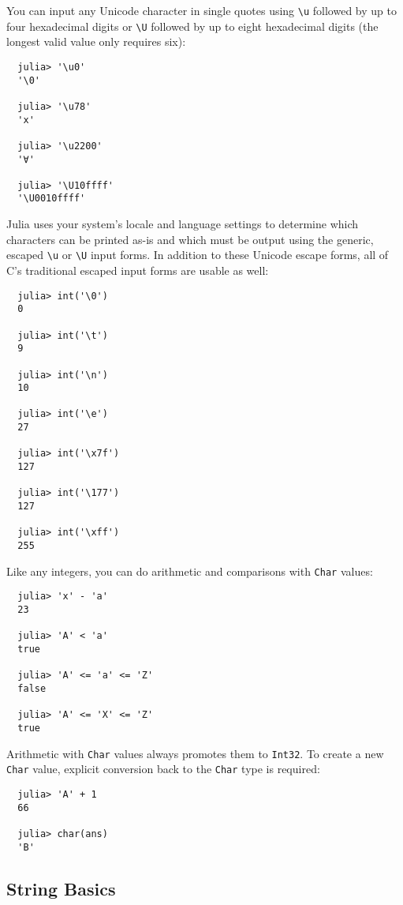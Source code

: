 \documentclass{article}
\begin{document}
You can input any Unicode character in single quotes using \verb|\u| followed by up to four hexadecimal digits or \verb|\U| followed by up to eight hexadecimal digits (the longest valid value only requires six):
\begin{verbatim}
  julia> '\u0'
  '\0'

  julia> '\u78'
  'x'

  julia> '\u2200'
  '∀'

  julia> '\U10ffff'
  '\U0010ffff'
\end{verbatim}
Julia uses your system's locale and language settings to determine which characters can be printed as-is and which must be output using the generic, escaped \verb|\u| or \verb|\U| input forms.
In addition to these Unicode escape forms, all of C's traditional escaped input forms are usable as well:
\begin{verbatim}
  julia> int('\0')
  0

  julia> int('\t')
  9

  julia> int('\n')
  10

  julia> int('\e')
  27

  julia> int('\x7f')
  127

  julia> int('\177')
  127

  julia> int('\xff')
  255
\end{verbatim}
Like any integers, you can do arithmetic and comparisons with \verb|Char| values:
\begin{verbatim}
  julia> 'x' - 'a'
  23

  julia> 'A' < 'a'
  true

  julia> 'A' <= 'a' <= 'Z'
  false

  julia> 'A' <= 'X' <= 'Z'
  true
\end{verbatim}
Arithmetic with \verb|Char| values always promotes them to \verb|Int32|.
To create a new \verb|Char| value, explicit conversion back to the \verb|Char| type is required:
\begin{verbatim}
  julia> 'A' + 1
  66

  julia> char(ans)
  'B'
\end{verbatim}

\subsection{String Basics}
\end{document}
